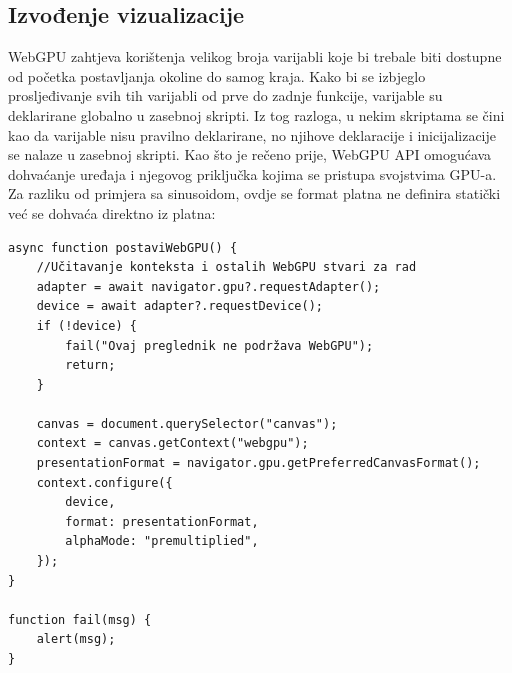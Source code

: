 \documentclass{foi}
\begin{document}
\subsection{Izvođenje vizualizacije}

WebGPU zahtjeva korištenja velikog broja varijabli koje bi trebale biti dostupne od početka postavljanja okoline do samog kraja. Kako bi se izbjeglo prosljeđivanje svih tih varijabli od prve do zadnje funkcije, varijable su deklarirane globalno u zasebnoj skripti. Iz tog razloga, u nekim skriptama se čini kao da varijable nisu pravilno deklarirane, no njihove deklaracije i inicijalizacije se nalaze u zasebnoj skripti. Kao što je rečeno prije, WebGPU API omogućava dohvaćanje uređaja i njegovog priključka kojima se pristupa svojstvima GPU-a. Za razliku od primjera sa sinusoidom, ovdje se format platna ne definira statički već se dohvaća direktno iz platna:
\begin{verbatim}
async function postaviWebGPU() {
	//Učitavanje konteksta i ostalih WebGPU stvari za rad
	adapter = await navigator.gpu?.requestAdapter();
	device = await adapter?.requestDevice();
	if (!device) {
		fail("Ovaj preglednik ne podržava WebGPU");
		return;
	}
	
	canvas = document.querySelector("canvas");
	context = canvas.getContext("webgpu");
	presentationFormat = navigator.gpu.getPreferredCanvasFormat();
	context.configure({
		device,
		format: presentationFormat,
		alphaMode: "premultiplied",
	});
}

function fail(msg) {
	alert(msg);
}

\end{verbatim}
\end{document}
